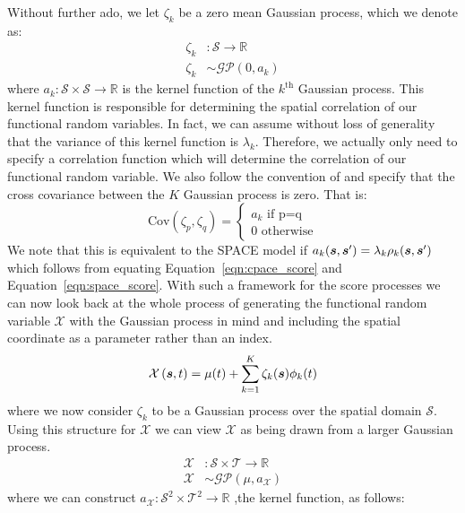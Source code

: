 Without further ado, we let $\zeta_k$ be a zero mean Gaussian process, which we denote as:
\begin{align}
	\zeta_k&: \mathcal{S} \to \mathbb{R} \\
	\zeta_k &\sim \mathcal{GP}\left(0, a_k \right)
\end{align}
where $a_k: \mathcal{S} \times \mathcal{S} \to \mathbb{R} $ is the kernel function of the $k^\text{th}$ Gaussian process. 
This kernel function is responsible for determining the spatial correlation of our functional random variables. 
In fact, we can assume without loss of generality that the variance of this kernel function is $\lambda_k$.
Therefore, we  actually only need to specify a correlation function which will determine the correlation of our functional random variable. 
We also follow the convention of \citep{liu_functional_2017} and specify that the cross covariance between the $K$ Gaussian process is zero.
That is:
\begin{equation}
	\text{Cov}\left(\zeta_p, \zeta_q\right) = \begin{cases}
		a_k \text{ if p=q} \\
		0 \text{ otherwise}
	\end{cases}
	\label{eqn:cpace_score}
\end{equation}
We note that this is equivalent to the SPACE model  if $a_k(\bm{{s}}, \bm{{s}}^{\prime})  = \lambda_k \rho_k(\bm{{s}}, \bm{{s}}^{\prime})$ which follows from equating Equation~\ref{eqn:cpace_score} and Equation~\ref{eqn:space_score}.
With such a framework for the score processes we can now look back at the whole process of generating the functional random variable $\mathcal{X}$ with the Gaussian process in mind and including the spatial coordinate as a parameter rather than an index.
\begin{equation}
	\mathcal{X}\left(\bm{{s}}, t \right) = \mu(t) + \sum_{k=1}^K \zeta_k(\bm{{s}}) \phi_k(t)
	\label{eqn:fpca_cpace}
\end{equation}
where we now consider $\zeta_k$ to be a Gaussian process over the spatial domain $\mathcal{S}$.
Using this structure for $\mathcal{X}$ we can view $\mathcal{X}$ as being drawn from a larger Gaussian process. 
\begin{align}
	\mathcal{X}&: \mathcal{S} \times \mathcal{T} \to \mathbb{R}\\
	\mathcal{X} &\sim \mathcal{GP}\left(\mu, a_\mathcal{X}\right)
\end{align}
where we can construct $a_\mathcal{X}: \mathcal{S}^2 \times \mathcal{T}^2 \to \mathbb{R}$ ,the kernel function, as follows: 
